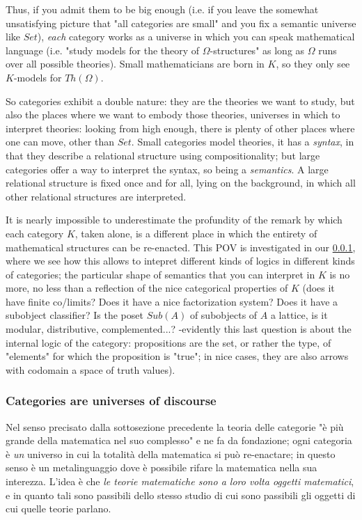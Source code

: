 Thus, if you admit them to be big enough (i.e. if you leave the somewhat unsatisfying picture that "all categories are small" and you fix a semantic universe like $Set$), \emph{each} category works as a universe in which you can speak mathematical language (i.e. "study models for the theory of $\Omega$-structures" as long as $\Omega$ runs over all possible theories). Small mathematicians are born in $K$, so they only see $K$-models for $Th(\Omega)$.

So categories exhibit a double nature: they are the theories we want to study, but also the places where we want to embody those theories, universes in which to interpret theories: looking from high enough, there is plenty of other places where one can move, other than $Set$. Small categories model theories, it has a \emph{syntax}, in that they describe a relational structure using compositionality; but large categories offer a way to interpret the syntax, so being a \emph{semantics}. A large relational structure is fixed once and for all, lying on the background, in which all other relational structures are interpreted.

It is nearly impossible to underestimate the profundity of the remark by which each category $K$, taken alone, is a different place in which the entirety of mathematical structures can be re-enacted. This POV is investigated in our \ref{}, where we see how this allows to intepret different kinds of logics in different kinds of categories; the particular shape of semantics that you can interpret in $K$ is no more, no less than a reflection of the nice categorical properties of $K$ (does it have finite co/limits? Does it have a nice factorization system? Does it have a subobject classifier? Is the poset $Sub(A)$ of subobjects of $A$ a lattice, is it modular, distributive, complemented...? -evidently this last question is about the internal logic of the category: propositions are the set, or rather the type, of "elements" for which the proposition is "true"; in nice cases, they are also arrows with codomain a space of truth values).
\subsubsection{Categories are universes of discourse}
Nel senso precisato dalla sottosezione precedente la teoria delle categorie "è più grande della matematica nel suo complesso" e ne fa da fondazione; ogni categoria è \emph{un} universo in cui la totalità della matematica si può re-enactare; in questo senso è un metalinguaggio dove è possibile rifare la matematica nella sua interezza. L'idea è che \emph{le teorie matematiche sono a loro volta oggetti matematici}, e in quanto tali sono passibili dello stesso studio di cui sono passibili gli oggetti di cui quelle teorie parlano.

